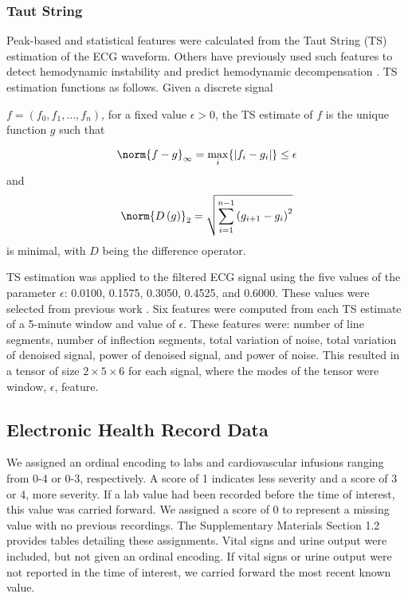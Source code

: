 \subsubsection*{Taut String} \label{sec:methods_ts}
Peak-based and statistical features were calculated from the Taut String (TS) estimation \autocite{taut_string} of the ECG waveform. Others have previously used such features to detect hemodynamic instability \autocite{belle_signal_2016} and predict hemodynamic decompensation \autocite{hernandez_multimodal_2021, kim_prediction_2022}. TS estimation functions as follows. Given a discrete signal

$f = (f_0, f_1, ..., f_n)$,
for a fixed value $\epsilon > 0$, the TS estimate of $f$ is the unique function $g$ such that 

\begin{equation*}
    \norm{f - g}_{\infty} = \max\limits_{i}\{ \lvert f_i - g_i \rvert \} \leq \epsilon
\end{equation*}
and
\begin{equation*}
    \norm{D\left( g \right)}_{2} = \sqrt{\sum^{n - 1}_{i = 1} \left( g_{i + 1} - g_i \right)^2}
\end{equation*}
is minimal, with $D$ being the difference operator.

TS estimation was applied to the filtered ECG signal using the five values of the parameter $\epsilon$: 0.0100, 0.1575, 0.3050, 0.4525, and 0.6000. These values were selected from previous work \autocite{hernandez_multimodal_2021}. Six features were computed from each TS estimate of a 5-minute window and value of $\epsilon$. These features were: number of line segments, number of inflection segments, total variation of noise, total variation of denoised signal, power of denoised signal, and power of noise. This resulted in a tensor of size $2 \times 5 \times 6$ for each signal, where the modes of the tensor were window, $\epsilon$, feature. 

\subsection*{Electronic Health Record Data} \label{sec:methods_ehr}
We assigned an ordinal encoding to labs and cardiovascular infusions ranging from 0-4 or 0-3, respectively. A score of 1 indicates less severity and a score of 3 or 4, more severity. If a lab value had been recorded before the time of interest, this value was carried forward. We assigned a score of 0 to represent a missing value with no previous recordings. The Supplementary Materials Section 1.2 provides tables detailing these assignments. Vital signs and urine output were included, but not given an ordinal encoding. If vital signs or urine output were not reported in the time of interest, we carried forward the most recent known value.


